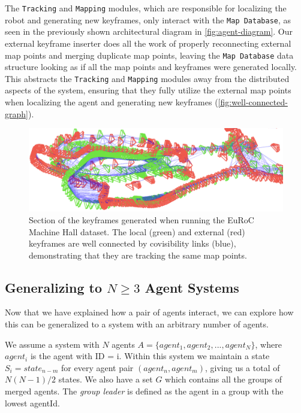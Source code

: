 The \texttt{Tracking} and \texttt{Mapping} modules, which are responsible for localizing the robot and generating new keyframes, only interact with the \texttt{Map Database}, as seen in the previously shown architectural diagram in \autoref{fig:agent-diagram}. Our external keyframe inserter does all the work of properly reconnecting external map points and merging duplicate map points, leaving the \texttt{Map Database} data structure looking as if all the map points and keyframes were generated locally. This abstracts the \texttt{Tracking} and \texttt{Mapping} modules away from the distributed aspects of the system, ensuring that they fully utilize the external map points when localizing the agent and generating new keyframes (\autoref{fig:well-connected-graph}).


\begin{figure}[h]
    \centering
    \includegraphics[width=0.8\linewidth]{figures/map_integration.png}

    \caption{Section of the keyframes generated when running the EuRoC Machine Hall dataset. The local (green) and external (red) keyframes are well connected by covisibility links (blue), demonstrating that they are tracking the same map points.}
    \label{fig:well-connected-graph}
\end{figure}

\subsection{Generalizing to $N \geq 3$ Agent Systems}
\label{sec:generalizing-to-n-geq-3-agent-systems}
Now that we have explained how a pair of agents interact, we can explore how this can be generalized to a system with an arbitrary number of agents.

We assume a system with $N$ agents $A=\{agent_1, agent_2, ..., agent_N\}$, where $agent_i$ is the agent with ID = i. Within this system we maintain a state $S_i=state_{n-m}$ for every agent pair $(agent_n, agent_m)$, giving us a total of $N(N-1)/2$ states. We also have a set $G$ which contains all the groups of merged agents. The \textit{group leader} is defined as the agent in a group with the lowest agentId.


